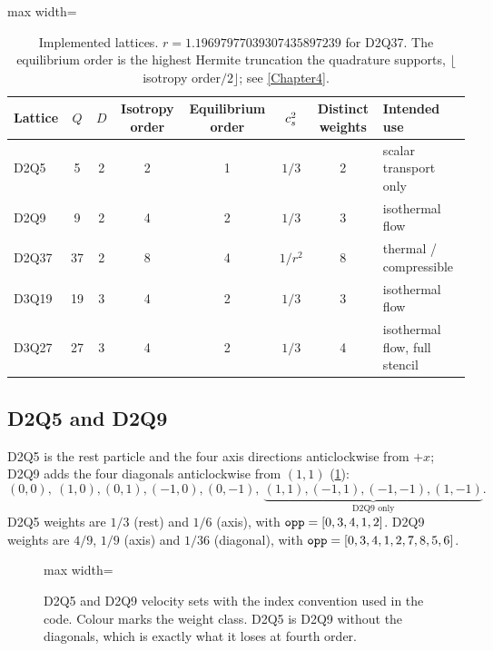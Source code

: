\begin{table}[h]
\centering\small
\begin{adjustbox}{max width=\linewidth}
\begin{tabular}{@{}lccccccl@{}}
\toprule
Lattice & $Q$ & $D$ & Isotropy order & Equilibrium order & $c_s^2$ & Distinct weights & Intended use \\
\midrule
D2Q5  & 5  & 2 & 2 & 1 & $1/3$   & 2 & scalar transport only \\
D2Q9  & 9  & 2 & 4 & 2 & $1/3$   & 3 & isothermal flow \\
D2Q37 & 37 & 2 & 8 & 4 & $1/r^2$ & 8 & thermal / compressible \\
D3Q19 & 19 & 3 & 4 & 2 & $1/3$   & 3 & isothermal flow \\
D3Q27 & 27 & 3 & 4 & 2 & $1/3$   & 4 & isothermal flow, full stencil \\
\bottomrule
\end{tabular}
\end{adjustbox}
\caption{Implemented lattices. $r = 1.19697977039307435897239$ for D2Q37. The equilibrium
order is the highest Hermite truncation the quadrature supports, $\lfloor$isotropy
order$/2\rfloor$; see \cref{Chapter4}.}
\label{tab:catalogue}
\end{table}

\subsection{D2Q5 and D2Q9}

D2Q5 is the rest particle and the four axis directions anticlockwise from $+x$; D2Q9 adds
the four diagonals anticlockwise from $(1,1)$ (\cref{fig:d2q9}):
\[
(0,0),\ (1,0),(0,1),(-1,0),(0,-1),\ \underbrace{(1,1),(-1,1),(-1,-1),(1,-1)}_{\text{D2Q9 only}}.
\]
D2Q5 weights are $1/3$ (rest) and $1/6$ (axis), with $\texttt{opp} = [0,3,4,1,2]$. D2Q9 weights
are $4/9$, $1/9$ (axis) and $1/36$ (diagonal), with $\texttt{opp} = [0,3,4,1,2,7,8,5,6]$.

\begin{figure}[h]
\centering
\begin{adjustbox}{max width=\linewidth}\end{adjustbox}
\caption{D2Q5 and D2Q9 velocity sets with the index convention used in the code. Colour
marks the weight class. D2Q5 is D2Q9 without the diagonals, which is exactly what it loses
at fourth order.}
\label{fig:d2q9}
\end{figure}

